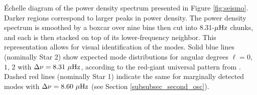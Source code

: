 \label{fig:echelle} \'Echelle diagram of the power density spectrum presented in Figure \ref{fig:seismo}. Darker regions correspond to larger peaks in power density. The power density spectrum is smoothed by a boxcar over nine bins then cut into 8.31-$\mu\rm{Hz}$ chunks, and each is then stacked on top of its lower-frequency neighbor. This representation allows for visual identification of the modes. Solid blue lines (nominally Star 2) show expected mode distributions for angular degrees $\ell = 0$, $1$, $2$ with $\Delta\nu = 8.31\ \mu\rm{Hz}$, according to the red-giant universal pattern from \citet{mos10}. Dashed red lines (nominally Star 1) indicate the same for marginally detected modes with $\Delta\nu = 8.60\ \mu\rm{Hz}$ (see Section \ref{subsubsec_second_osc}).

  
  
  